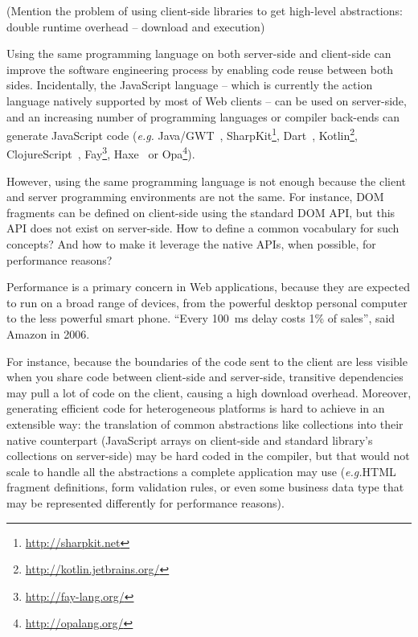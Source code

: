 \documentclass[preprint]{sigplanconf}
\newcommand{\eg}{\emph{e.g.}}
\begin{document}
(Mention the problem of using client-side libraries to get high-level abstractions: double runtime overhead --
download and execution)

Using the same programming language on both server-side and client-side can improve the software engineering
process by enabling code reuse between both sides. Incidentally, the JavaScript language -- which is currently the
action language natively supported by most of Web clients -- can be used on server-side, and an increasing
number of programming languages or compiler back-ends can generate JavaScript code (\eg
Java/GWT~\cite{Chaganti07_GWT}, SharpKit\footnote{\href{http://sharpkit.net}{http://sharpkit.net}},
Dart~\cite{Griffith11_Dart}, Kotlin\footnote{\href{http://kotlin.jetbrains.org/}{http://kotlin.jetbrains.org/}},
ClojureScript~\cite{McGranaghan11_ClojureScript}, Fay\footnote{\href{http://fay-lang.org/}{http://fay-lang.org/}},
Haxe~\cite{Cannasse08_HaXe} or Opa\footnote{\href{http://opalang.org/}{http://opalang.org/}}).

However, using the same programming language is not enough because the client and server programming environments
are not the same. For instance, DOM fragments can be defined on client-side using the standard DOM API, but this
API does not exist on server-side. How to define a common vocabulary for such concepts? And how to make it leverage
the native APIs, when possible, for performance reasons?

Performance is a primary concern in Web applications, because they are expected to run on a broad range of devices,
from the powerful desktop personal computer to the less powerful smart phone. “Every 100~ms delay costs 1\% of
sales”, said Amazon in 2006.

For instance, because the boundaries of the code sent to the client are less visible when you share code between
client-side and server-side, transitive dependencies may pull a lot of code on the client, causing a high download
overhead. Moreover, generating efficient code for heterogeneous platforms is hard to achieve in an extensible way:
the translation of common abstractions like collections into their native counterpart (JavaScript arrays on
client-side and standard library's collections on server-side) may be hard coded in the compiler, but that would not
scale to handle all the abstractions a complete application may use (\eg HTML fragment definitions, form validation
rules, or even some business data type that may be represented differently for performance reasons).
\end{document}
